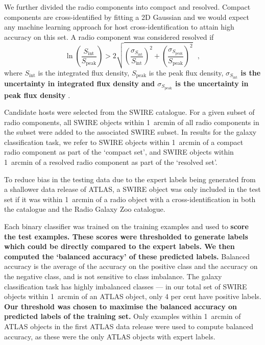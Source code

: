 \documentclass[fleqn,usenatbib,usedcolumn]{mnras}
\newcommand{\edited}[1]{{\bf {#1}}}
\begin{document}
    We further divided the radio components into compact and resolved. Compact
    components are cross-identified by fitting a 2D Gaussian \citep[as
    in][]{norris06} and we would expect any machine learning approach for host
    cross-identification to attain high accuracy on this set. A radio component was
    considered resolved if
    \begin{equation}
      \label{eq:compact}
        \ln \left(
          \frac{S_{\text{int}}}
               {S_{\text{peak}}}
        \right) > 2\sqrt{\left(
          \frac{\sigma_{S_{\text{int}}}}
               {S_{\text{int}}}
        \right)^2 + \left(
          \frac{\sigma_{S_{\text{peak}}}}
               {S_{\text{peak}}}
        \right)^2}\,\,\,\,,
    \end{equation}%
    where \(S_{\text{int}}\) is the integrated flux density,
    \(S_{\text{peak}}\) is the peak flux density, \edited{$\sigma_{S_{\text{int}}}$ is
    the uncertainty in integrated flux density and $\sigma_{S_{\text{peak}}}$
    is the uncertainty in peak flux density} \citep[following][]{franzen15}.

    Candidate hosts were selected from the SWIRE catalogue. For a given subset
    of radio components, all SWIRE objects within 1~arcmin of all radio
    components in the subset were added to the associated SWIRE subset. In results
    for the galaxy classification task, we refer to SWIRE objects
    within 1~arcmin of a compact radio component as part of the `compact set',
    and SWIRE objects within 1~arcmin of a resolved radio component as part of
    the `resolved set'.

    To reduce bias in the testing data due to the expert labels being
    generated from a shallower data release of ATLAS, a SWIRE object was only
    included in the test set if it was within 1~arcmin of a radio object with
    a cross-identification in both the \citet{norris06} catalogue and the
    Radio Galaxy Zoo catalogue.

    Each binary classifier was trained on the training examples and used to
    \edited{score the test examples. These scores were thresholded to generate labels which could be directly compared
    to the expert labels. We then computed the `balanced accuracy' of these predicted labels.} Balanced
    accuracy is the average of the accuracy on the positive class and the
    accuracy on the negative class, and is not sensitive to class imbalance.
    The galaxy classification task has highly imbalanced classes --- in our
    total set of SWIRE objects within 1~arcmin of an ATLAS object, only 4 per
    cent have positive labels. \edited{Our threshold was chosen to maximise the balanced
    accuracy on predicted labels of the training set.} Only examples within 1~arcmin of ATLAS objects
    in the first ATLAS data release \citep{norris06} were used to compute
    balanced accuracy, as these were the only ATLAS objects with expert labels.
\end{document}
